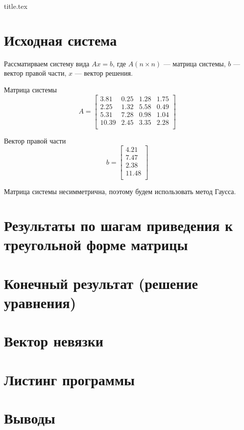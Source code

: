




{title.tex}

\clearpage



\clearpage
{}
\pagestyle{fancy}
\setcounter{page}{2}

\clearpage

\chapter{Исходная система}

Рассматирваем систему вида $Ax = b$, где $A \left( n \times n \right) $ --- матрица системы, $b$ --- вектор правой части, $x$ --- вектор решения.

Матрица системы
\begin{equation*}
A =
\begin{bmatrix}
    3.81 & 0.25 & 1.28 & 1.75 \\
    2.25 & 1.32 & 5.58 & 0.49 \\
    5.31 & 7.28 & 0.98 & 1.04 \\
    10.39 & 2.45 & 3.35 & 2.28 \\
\end{bmatrix}
\end{equation*}

Вектор правой части
\begin{equation*}
b =
\begin{bmatrix}
    4.21 \\
    7.47 \\
    2.38 \\
    11.48 \\
\end{bmatrix}
\end{equation*}

Матрица системы несимметрична, поэтому будем использовать метод Гаусса.

\chapter{Результаты по шагам приведения к треугольной форме матрицы}

\chapter{Конечный результат (решение уравнения)}

\chapter{Вектор невязки}

\chapter{Листинг программы}

\chapter*{Выводы}



